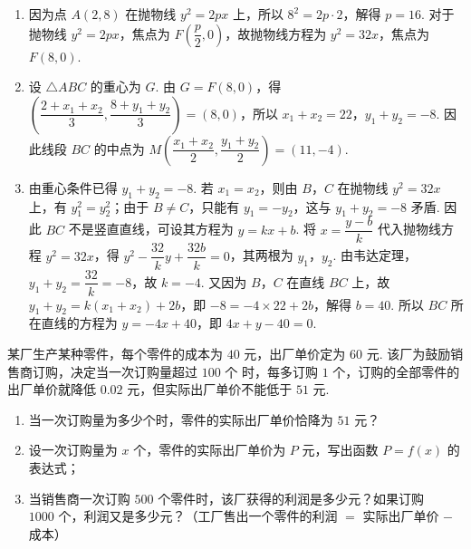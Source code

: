 \begin{solution}
\begin{enumerate}
\item 因为点 \(A(2,8)\) 在抛物线 \(y^2=2px\) 上，所以 \(8^2=2p\cdot2\)，解得 \(p=16\). 对于抛物线 \(y^2=2px\)，焦点为 \(F\left(\dfrac p2,0\right)\)，故抛物线方程为 \(y^2=32x\)，焦点为 \(F(8,0)\).
\item 设 \(\triangle ABC\) 的重心为 \(G\). 由 \(G=F(8,0)\)，得 \(\left(\dfrac{2+x_1+x_2}{3},\dfrac{8+y_1+y_2}{3}\right)=(8,0)\)，所以 \(x_1+x_2=22\)，\(y_1+y_2=-8\). 因此线段 \(BC\) 的中点为 \(M\left(\dfrac{x_1+x_2}{2},\dfrac{y_1+y_2}{2}\right)=(11,-4)\).
\item 由重心条件已得 \(y_1+y_2=-8\). 若 \(x_1=x_2\)，则由 \(B\)，\(C\) 在抛物线 \(y^2=32x\) 上，有 \(y_1^2=y_2^2\)；由于 \(B\ne C\)，只能有 \(y_1=-y_2\)，这与 \(y_1+y_2=-8\) 矛盾. 因此 \(BC\) 不是竖直直线，可设其方程为 \(y=kx+b\). 将 \(x=\dfrac{y-b}{k}\) 代入抛物线方程 \(y^2=32x\)，得 \(y^2-\dfrac{32}{k}y+\dfrac{32b}{k}=0\)，其两根为 \(y_1\)，\(y_2\). 由韦达定理，\(y_1+y_2=\dfrac{32}{k}=-8\)，故 \(k=-4\). 又因为 \(B\)，\(C\) 在直线 \(BC\) 上，故 \(y_1+y_2=k(x_1+x_2)+2b\)，即 \(-8=-4\times22+2b\)，解得 \(b=40\). 所以 \(BC\) 所在直线的方程为 \(y=-4x+40\)，即 \(4x+y-40=0\).
\end{enumerate}
\end{solution}

\begin{problem}
某厂生产某种零件，每个零件的成本为 \(40\text{ 元}\)，出厂单价定为 \(60\text{ 元}\). 该厂为鼓励销售商订购，决定当一次订购量超过 \(100\text{ 个}\) 时，每多订购 \(1\text{ 个}\)，订购的全部零件的出厂单价就降低 \(0.02\text{ 元}\)，但实际出厂单价不能低于 \(51\text{ 元}\).

\begin{enumerate}
\item 当一次订购量为多少\(\text{个}\)时，零件的实际出厂单价恰降为 \(51\text{ 元}\)？
\item 设一次订购量为 \(x\text{ 个}\)，零件的实际出厂单价为 \(P\text{ 元}\)，写出函数 \(P=f(x)\) 的表达式；
\item 当销售商一次订购 \(500\text{ 个}\)零件时，该厂获得的利润是多少\(\text{元}\)？如果订购 \(1000\text{ 个}\)，利润又是多少\(\text{元}\)？（工厂售出一个零件的利润 \(=\) 实际出厂单价 \(-\) 成本）
\end{enumerate}
\end{problem}

